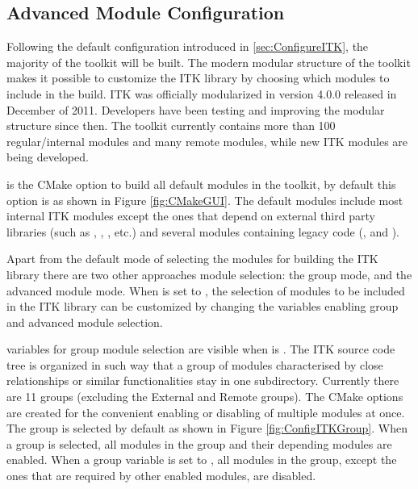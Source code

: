 \subsection{Advanced Module Configuration}
\label{sec:ModuleConfiguration}


Following the default configuration introduced in \ref{sec:ConfigureITK},
the majority of the toolkit will be built. The modern modular structure of the
toolkit makes it possible to customize the ITK library by choosing which modules
to include in the build. ITK was officially modularized in version 4.0.0
released in December of 2011. Developers have been testing and improving the
modular structure since then. The toolkit currently contains more than 100
regular/internal modules and many remote modules, while new ITK modules are
being developed.

 is the CMake option to build all default
modules in the toolkit, by default this option is  as shown in Figure
\ref{fig:CMakeGUI}. The default modules include most internal ITK modules except
the ones that depend on external third party libraries (such as
, , , etc.) and
several modules containing legacy code (, 
and ).

Apart from the default mode of selecting the modules for building the ITK
library there are two other approaches module selection: the group mode, and the
advanced module mode. When  is set to
, the selection of modules to be included in the ITK library can be
customized by changing the variables enabling group and advanced module
selection.

 variables for group module selection are visible
when  is . The ITK source code tree
is organized in such way that a group of modules characterised by close
relationships or similar functionalities stay in one subdirectory. Currently
there are 11 groups (excluding the External and Remote groups). The CMake
 options are created for the convenient enabling
or disabling of multiple modules at once. The  group is
selected by default as shown in Figure \ref{fig:ConfigITKGroup}. When a group is
selected, all modules in the group and their depending modules are enabled. When
a group variable is set to , all modules in the group, except the ones
that are required by other enabled modules, are disabled.

